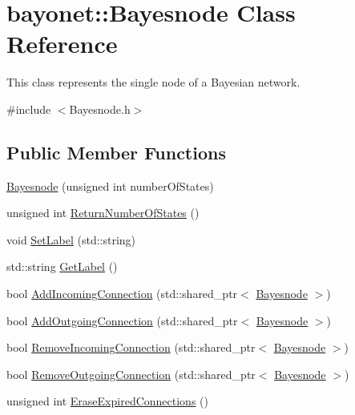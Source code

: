 \hypertarget{classbayonet_1_1_bayesnode}{\section{bayonet\-:\-:Bayesnode Class Reference}
\label{classbayonet_1_1_bayesnode}
}


This class represents the single node of a Bayesian network.  




{\ttfamily \#include $<$Bayesnode.\-h$>$}

\subsection*{Public Member Functions}
\begin{DoxyCompactItemize}
\item 
\hyperlink{classbayonet_1_1_bayesnode_a2b676188453fbbb4dc96be714ac931d3}{Bayesnode} (unsigned int number\-Of\-States)
\item 
unsigned int \hyperlink{classbayonet_1_1_bayesnode_a24d38b28413a60938ea7fad7c74e823d}{Return\-Number\-Of\-States} ()
\item 
void \hyperlink{classbayonet_1_1_bayesnode_abaa27f1597d5599344e3a4d82e7b64b0}{Set\-Label} (std\-::string)
\item 
std\-::string \hyperlink{classbayonet_1_1_bayesnode_aebe7f411efe8b8647ed6f7d28f700638}{Get\-Label} ()
\item 
bool \hyperlink{classbayonet_1_1_bayesnode_ad8dbca37751fc6387a370daea4233aaf}{Add\-Incoming\-Connection} (std\-::shared\-\_\-ptr$<$ \hyperlink{classbayonet_1_1_bayesnode}{Bayesnode} $>$)
\item 
bool \hyperlink{classbayonet_1_1_bayesnode_ac43991461780ca9056b4977db4cbd603}{Add\-Outgoing\-Connection} (std\-::shared\-\_\-ptr$<$ \hyperlink{classbayonet_1_1_bayesnode}{Bayesnode} $>$)
\item 
bool \hyperlink{classbayonet_1_1_bayesnode_a2e401b2dbc46513c016d2c894fde3726}{Remove\-Incoming\-Connection} (std\-::shared\-\_\-ptr$<$ \hyperlink{classbayonet_1_1_bayesnode}{Bayesnode} $>$)
\item 
bool \hyperlink{classbayonet_1_1_bayesnode_a5a8ffea3ad34391225c307ad047969c0}{Remove\-Outgoing\-Connection} (std\-::shared\-\_\-ptr$<$ \hyperlink{classbayonet_1_1_bayesnode}{Bayesnode} $>$)
\item 
unsigned int \hyperlink{classbayonet_1_1_bayesnode_a6b85e5dcadbf79631f5789fb205d076d}{Erase\-Expired\-Connections} ()

\end{DoxyCompactItemize}
